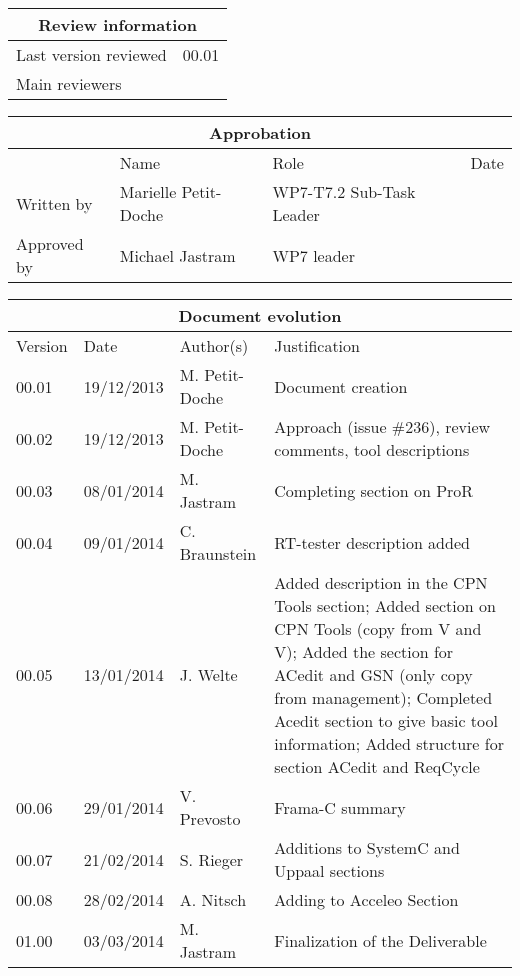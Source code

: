 \documentclass{template/openetcs_report}
\begin{document}
\begin{tabular}{|p{4.4cm}|p{8.7cm}|}
\hline
\multicolumn{2}{|c|}{Review information} \\
\hline
Last version reviewed & 00.01 \\
\hline
Main reviewers &  \\
 
\hline
\end{tabular}

\begin{tabular}{|p{2.2cm}|p{4cm}|p{4cm}|p{2cm}|}
\hline
\multicolumn{4}{|c|}{Approbation} \\
\hline
  &  Name & Role & Date   \\
\hline  
Written by    &  Marielle Petit-Doche & WP7-T7.2 Sub-Task Leader  & \\
\hline
Approved by & Michael Jastram & WP7 leader & \\
\hline
\end{tabular}

\begin{tabular}{|p{2.2cm}|p{2cm}|p{3cm}|p{5cm}|}
\hline
\multicolumn{4}{|c|}{Document evolution} \\
\hline
Version &  Date & Author(s) & Justification  \\
\hline  
00.01 & 19/12/2013 & M. Petit-Doche &  Document creation  \\
\hline  
00.02 & 19/12/2013 & M. Petit-Doche &  Approach (issue \#236), review comments, tool descriptions  \\
\hline
00.03 & 08/01/2014 & M. Jastram & Completing section on ProR \\
\hline
00.04 & 09/01/2014 & C. Braunstein & RT-tester description added \\
\hline  
00.05 & 13/01/2014 & J. Welte & Added description in the CPN Tools section; Added section on CPN Tools (copy from V and V); Added the section for ACedit and GSN (only copy from management);  Completed Acedit section to give basic tool information; Added structure for section ACedit and ReqCycle \\
\hline  
00.06 & 29/01/2014 & V. Prevosto &  Frama-C summary \\
\hline
00.07 & 21/02/2014 & S. Rieger &  Additions to SystemC and Uppaal sections \\
\hline  
00.08 & 28/02/2014 & A. Nitsch & Adding to Acceleo Section \\
\hline  
01.00 & 03/03/2014 & M. Jastram &  Finalization of the Deliverable  \\
\hline 
\end{tabular}
\end{document}
